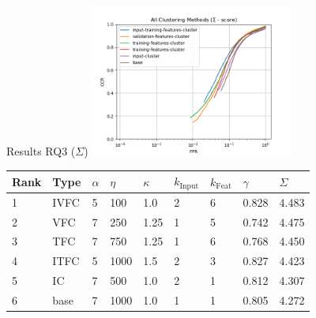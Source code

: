 \begin{frame}{Results RQ3 ($\Sigma$)}
	\centering
	\includegraphics[width=0.5\textwidth]{figures/all_methods_sigma.png}
	\footnotesize{
		\begin{tabularx}{\textwidth}{ |X|X|X|X|X|X|X|X|X|}
			\hline
			Rank & Type & $\alpha$ & $\eta$ & $\kappa$ & $k_{\text{Input}}$ & $k_{\text{Feat}}$ & $\gamma$ & $\Sigma$ \\
			\hline
			1    & IVFC & 5        & 100    & 1.0      & 2                  & 6                 & 0.828    & 4.483    \\
			2    & VFC  & 7        & 250    & 1.25     & 1                  & 5                 & 0.742    & 4.475    \\
			3    & TFC  & 7        & 750    & 1.25     & 1                  & 6                 & 0.768    & 4.450    \\
			4    & ITFC & 5        & 1000   & 1.5      & 2                  & 3                 & 0.827    & 4.423    \\
			5    & IC   & 7        & 500    & 1.0      & 2                  & 1                 & 0.812    & 4.307    \\
			6    & base & 7        & 1000   & 1.0      & 1                  & 1                 & 0.805    & 4.272    \\
			\hline
		\end{tabularx}
	}
\end{frame}

